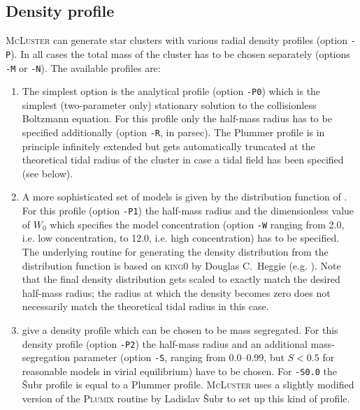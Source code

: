 \documentclass[useAMS,usenatbib]{mn2e}
\begin{document}
\subsection*{Density profile}
\textsc{McLuster} can generate star clusters with various radial density profiles (option \texttt{-P}). In all cases the total mass of the cluster has to be chosen separately (options \texttt{-M} or \texttt{-N}). The available profiles are:
\begin{enumerate}
\item The simplest option is the analytical \citet{Plummer11} profile (option \texttt{-P0}) which is the simplest (two-parameter only) stationary solution to the collisionless Boltzmann equation. For this profile only the half-mass radius has to be specified additionally (option \texttt{-R}, in parsec). The Plummer profile is in principle infinitely extended but gets automatically truncated at the theoretical tidal radius of the cluster in case a tidal field has been specified (see below).
\item A more sophisticated set of models is given by the distribution function of \citet{King66}. For this profile (option \texttt{-P1}) the half-mass radius and the dimensionless value of $W_0$ which specifies the model concentration (option \texttt{-W} ranging from 2.0, i.e. low concentration, to 12.0, i.e. high concentration) has to be specified. The underlying routine for generating the density distribution from the distribution function is based on \textsc{king0} by Douglas C.~Heggie (e.g. \citealt{Heggie92}). Note that the final density distribution gets scaled to exactly match the desired half-mass radius; the radius at which the density becomes zero does not necessarily match the theoretical tidal radius in this case.
\item \citet{Subr08} give a density profile which can be chosen to be mass segregated. For this density profile (option \texttt{-P2}) the half-mass radius and an additional mass-segregation parameter (option \texttt{-S}, ranging from 0.0--0.99, but $S<0.5$ for reasonable models in virial equilibrium) have to be chosen. For \texttt{-S0.0} the {\v S}ubr profile is equal to a Plummer profile. \textsc{McLuster} uses a slightly modified version of the \textsc{Plumix} routine by Ladislav {\v S}ubr to set up this kind of profile.

\end{enumerate}
\end{document}
